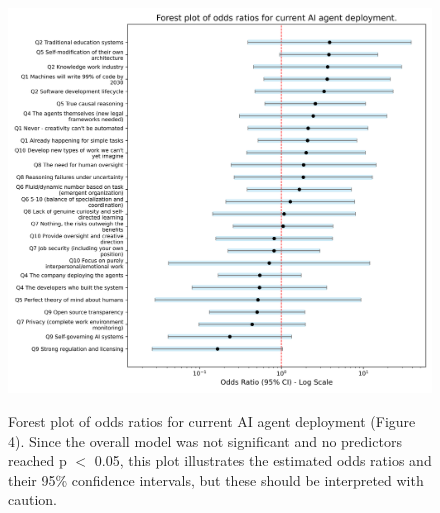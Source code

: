 \documentclass{article}
\begin{document}
\begin{figure}[htbp]

	{\includegraphics[width=\textwidth, keepaspectratio]{figs/logit_forest_plot_figure4.png}}

	\caption{Forest plot of odds ratios for current AI agent deployment (Figure 4). Since the overall model was not significant and no predictors reached p $<$ 0.05, this plot illustrates the estimated odds ratios and their 95\% confidence intervals, but these should be interpreted with caution.}\label{fig:logit_forest_plot}

\end{figure}%
\end{document}
